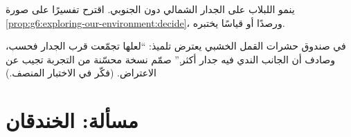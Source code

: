 \begin{exercise}[$\star\star$]\label{exo:g6:exploring-our-environment:11}
ينمو اللبلاب على الجدار الشمالي دون الجنوبي. اقترح تفسيرًا على صورة
\cref{prop:g6:exploring-our-environment:decide}، ورصدًا أو قياسًا
يختبره.
\end{exercise}

\begin{exercise}[$\star\star\star$]\label{exo:g6:exploring-our-environment:12}
في صندوق حشرات القمل الخشبي يعترض تلميذ: ``لعلها تجمّعت قرب الجدار
فحسب، وصادف أن الجانب الندي فيه جدار أكثر.'' صمّم نسخة محسّنة من
التجربة تجيب عن الاعتراض. (فكّر في الاختبار المنصف.)
\end{exercise}

\section{مسألة: الخندقان}

